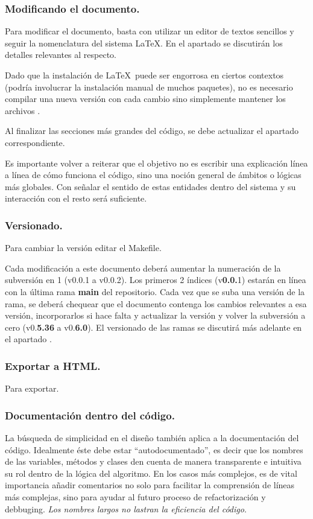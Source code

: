 \subsubsection*{Modificando el documento.}
Para modificar el documento, basta con utilizar un editor de textos sencillos y seguir la nomenclatura del sistema \LaTeX. En el apartado  se discutirán los detalles relevantes al respecto.

Dado que la instalación de \LaTeX\ puede ser engorrosa en ciertos contextos (podría involucrar la instalación manual de muchos paquetes), no es necesario compilar una nueva versión con cada cambio sino simplemente mantener los archivos .

Al finalizar las secciones más grandes del código, se debe actualizar el apartado correspondiente.

Es importante volver a reiterar que el objetivo no es escribir una explicación línea a línea de cómo funciona el código, sino una noción general de ámbitos o lógicas más globales. Con señalar el sentido de estas entidades dentro del sistema y su interacción con el resto será suficiente.

\subsubsection*{Versionado.}
Para cambiar la versión editar el Makefile.

Cada modificación a este documento deberá aumentar la numeración de la subversión en 1 (v0.0.1 a v0.0.2). Los primeros 2 índices (v\textbf{0.0.}1) estarán en línea con la última rama \textbf{main} del repositorio. Cada vez que se suba una versión de la rama, se deberá chequear que el documento contenga los cambios relevantes a esa versión, incorporarlos si hace falta y actualizar la versión y volver la subversión a cero (v0.\textbf{5.36} a v0.\textbf{6.0}). El versionado de las ramas se discutirá más adelante en el apartado .

\subsubsection*{Exportar a HTML.}
Para exportar.

\subsubsection{Documentación dentro del código.}\label{flujo:documentacion-en-codigo}
La búsqueda de simplicidad en el diseño también aplica a la documentación del código. Idealmente éste debe estar “autodocumentado”, es decir que los nombres de las variables, métodos y clases den cuenta de manera transparente e intuitiva su rol dentro de la lógica del algoritmo. En los casos más complejos, es de vital importancia añadir comentarios no solo para facilitar la comprensión de líneas más complejas, sino para ayudar al futuro proceso de refactorización y debbuging. \emph{Los nombres largos no lastran la eficiencia del código}.

